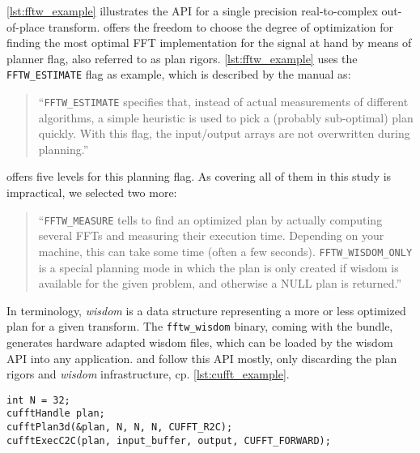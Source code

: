 \cref{lst:fftw_example} illustrates the \fftw{} API for a single precision real-to-complex out-of-place transform. \fftw{} offers the freedom to choose the degree of optimization for finding the most optimal FFT implementation for the signal at hand by means of planner flag, also referred to as plan rigors. \cref{lst:fftw_example} uses the \texttt{FFTW\_ESTIMATE} flag as example, which is described by the \fftw{} manual \cite{fftw_manual} as:
%
\begin{quote}
``\texttt{FFTW\_ESTIMATE} specifies that, instead of actual measurements of different algorithms, a simple heuristic is used to pick a (probably sub-optimal) plan quickly. With this flag, the input/output arrays are not overwritten during planning.''
\end{quote}
%
\fftw{} offers five levels for this planning flag. As covering all of them in this study is impractical, we selected two more:
\begin{quote}
``\texttt{FFTW\_MEASURE} tells \fftw{} to find an optimized plan by actually computing several FFTs and measuring their execution time. Depending on your machine, this can take some time (often a few seconds).\newline
\texttt{FFTW\_WISDOM\_ONLY} is a special planning mode in which the plan is only created if wisdom is available for the given problem, and otherwise a NULL plan is returned.''
\end{quote}
%
In \fftw{} terminology, \emph{wisdom} is a data structure representing a more or less optimized plan for a given transform. The \texttt{fftw\_wisdom} binary, coming with the \fftw{} bundle, generates hardware adapted wisdom files, which can be loaded by the wisdom API into any \fftw{} application.
%
\cufft{} and \clfft{} follow this API mostly, only discarding the plan rigors and \emph{wisdom} infrastructure, cp. \cref{lst:cufft_example}.

\begin{lstlisting}[caption={Minimal usage example of the \cufft{} single precision real-to-complex planner API. Memory management is omitted.},label={lst:cufft_example}]
int N = 32;
cufftHandle plan;
cufftPlan3d(&plan, N, N, N, CUFFT_R2C);
cufftExecC2C(plan, input_buffer, output, CUFFT_FORWARD);
\end{lstlisting}

